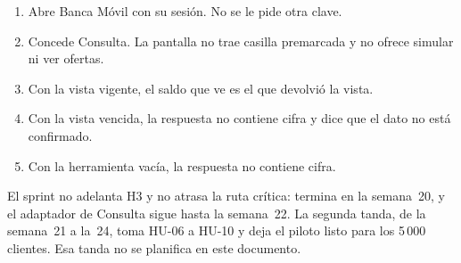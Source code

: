 \documentclass[11pt,a4paper]{article}
\begin{document}
\begin{enumerate}
  \item Abre Banca Móvil con su sesión. No se le pide otra clave.
  \item Concede Consulta. La pantalla no trae casilla premarcada y no ofrece simular ni ver ofertas.
  \item Con la vista vigente, el saldo que ve es el que devolvió la vista.
  \item Con la vista vencida, la respuesta no contiene cifra y dice que el dato no está confirmado.
  \item Con la herramienta vacía, la respuesta no contiene cifra.
\end{enumerate}

El sprint no adelanta H3 y no atrasa la ruta crítica: termina en la semana~20, y el adaptador de Consulta sigue hasta la semana~22. La segunda tanda, de la semana~21 a la~24, toma HU-06 a HU-10 y deja el piloto listo para los 5\,000 clientes. Esa tanda no se planifica en este documento.
\end{document}
